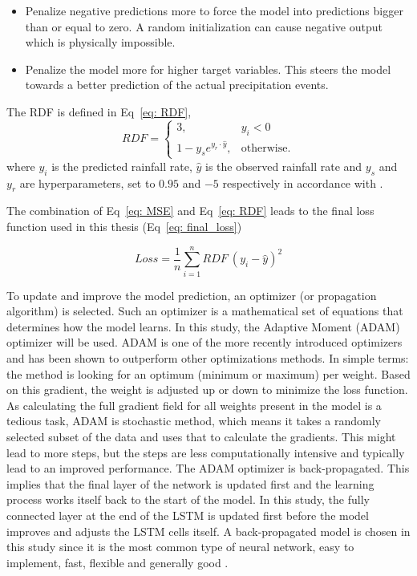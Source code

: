 \documentclass[twocolumn, 10pt, a4paper]{memoir}
\begin{document}
	\begin{itemize}
		\item Penalize negative predictions more to force the model into predictions bigger than or equal to zero. A random initialization can cause negative output which is physically impossible.
		\item Penalize the model more for higher target variables. This steers the model towards a better prediction of the actual precipitation events.
	\end{itemize}
	\vspace{3mm}
	The RDF is defined in Eq~\ref{eq: RDF},
	\begin{equation}
		\label{eq: RDF}
		RDF=\begin{cases}
			3, & y_i < 0\\
			1-y_s e^{y_r\cdot{}\hat{y}}, & \text{otherwise}.
		\end{cases}
	\end{equation}
	where $y_i$ is the predicted rainfall rate, $\hat{y}$ is the observed rainfall rate and $y_s$ and $y_r$ are hyperparameters, set to $0.95$ and $-5$ respectively in accordance with .
	
	The combination of Eq~\ref{eq: MSE} and Eq~\ref{eq: RDF} leads to the final loss function used in this thesis (Eq~\ref{eq: final_loss})
	
	\begin{equation}
		\label{eq: final_loss}
		Loss = \frac{1}{n} \sum_{i=1}^{n} RDF \ (y_i - \hat{y})^2
	\end{equation}
	
	To update and improve the model prediction, an optimizer (or propagation algorithm) is selected. Such an optimizer is a mathematical set of equations that determines how the model learns. In this study, the Adaptive Moment (ADAM) optimizer will be used. ADAM is one of the more recently introduced optimizers and has been shown to outperform other optimizations methods. \cite{Kingma2014} In simple terms: the method is looking for an optimum (minimum or maximum) per weight. Based on this gradient, the weight is adjusted up or down to minimize the loss function. As calculating the full gradient field for all weights present in the model is a tedious task, ADAM is stochastic method, which means it takes a randomly selected subset of the data and uses that to calculate the gradients. This might lead to more steps, but the steps are less computationally intensive and typically lead to an improved performance.  
	The ADAM optimizer is back-propagated. This implies that the final layer of the network is updated first and the learning process works itself back to the start of the model. In this study, the fully connected layer at the end of the LSTM is updated first before the model improves and adjusts the LSTM cells itself. A back-propagated model is chosen in this study since it is the most common type of neural network, easy to implement, fast, flexible and generally good \cite{Staudemeyer2019}.
	
\end{document}
